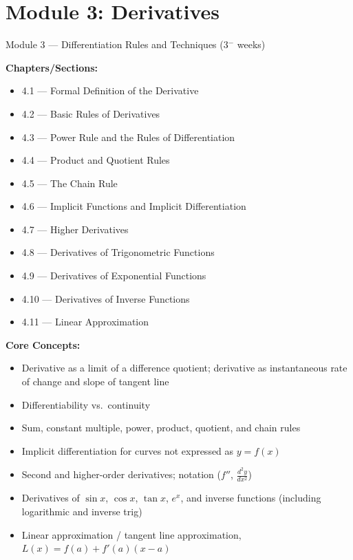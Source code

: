\documentclass[11pt]{article}
\begin{document}
\section{Module 3: Derivatives}
\label{mod:3}
\begin{modulebox}{Module 3 --- Differentiation Rules and Techniques \hfill (3$^-$ weeks)}

\textbf{Chapters/Sections:}
\begin{itemize}[nosep]
  \item 4.1 --- Formal Definition of the Derivative
  \item 4.2 --- Basic Rules of Derivatives
  \item 4.3 --- Power Rule and the Rules of Differentiation
  \item 4.4 --- Product and Quotient Rules
  \item 4.5 --- The Chain Rule
  \item 4.6 --- Implicit Functions and Implicit Differentiation
  \item 4.7 --- Higher Derivatives
  \item 4.8 --- Derivatives of Trigonometric Functions
  \item 4.9 --- Derivatives of Exponential Functions
  \item 4.10 --- Derivatives of Inverse Functions
  \item 4.11 --- Linear Approximation
\end{itemize}

\textbf{Core Concepts:}
\begin{itemize}[nosep]
  \item Derivative as a limit of a difference quotient; derivative as instantaneous rate of change and slope of tangent line
  \item Differentiability vs.\ continuity
  \item Sum, constant multiple, power, product, quotient, and chain rules
  \item Implicit differentiation for curves not expressed as $y = f(x)$
  \item Second and higher-order derivatives; notation ($f''$, $\frac{d^2y}{dx^2}$)
  \item Derivatives of $\sin x$, $\cos x$, $\tan x$, $e^x$, and inverse functions (including logarithmic and inverse trig)
  \item Linear approximation / tangent line approximation, $L(x) = f(a) + f'(a)(x-a)$
\end{itemize}


\end{modulebox}
\end{document}

